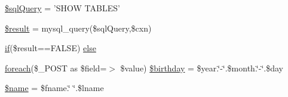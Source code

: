 \begin{DoxyCompactItemize}
\item 
\hyperlink{_m_c_mcreate_new_account_validator_8php_a08f961a26ebf8ad5411239bba701a67c}{\$sql\-Query} = 'S\-H\-O\-W T\-A\-B\-L\-E\-S'
\item 
\hyperlink{_m_c_mcreate_new_account_validator_8php_a112ef069ddc0454086e3d1e6d8d55d07}{\$result} = mysql\-\_\-query(\$sql\-Query,\$cxn)
\item 
\hyperlink{_m_c_maccount_settings_8php_a648419c218c2f0aeb239028519ab83d8}{if}(\$result==F\-A\-L\-S\-E) \hyperlink{_m_c_mcreate_new_account_validator_8php_a6b5f81c8ab2d615e3528311678d7870f}{else}
\item 
\hyperlink{_m_c_mlogin_8php_a58d12ec81e33be9b80508ee874adb2c1}{foreach}(\$\-\_\-\-P\-O\-S\-T as \$field=$>$ \$value) \hyperlink{_m_c_mcreate_new_account_validator_8php_ab8d98de5aa650b9f437292caa496b146}{\$birthday} = \$year.\char`\"{}-\/\char`\"{}.\$month.\char`\"{}-\/\char`\"{}.\$day
\item 
\hyperlink{_m_c_mcreate_new_account_validator_8php_ab2fc40d43824ea3e1ce5d86dee0d763b}{\$name} = \$fname.\char`\"{} \char`\"{}.\$lname
\end{DoxyCompactItemize}


